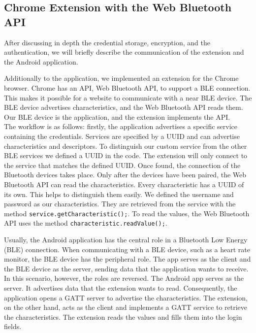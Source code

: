 
\subsection{Chrome Extension with the Web Bluetooth API}
After discussing in depth the credential storage, encryption, and the authentication, we will briefly describe the communication of the extension and the Android application.

Additionally to the application, we implemented an extension for the Chrome browser. Chrome has an API, Web Bluetooth API, to support a BLE connection. \cite{WebBTAPI} This makes it possible for a website to communicate with a near BLE device. The BLE device advertises characteristics, and the Web Bluetooth API reads them. Our BLE device is the application, and the extension implements the API. \\
The workflow is as follows: firstly, the application advertises a specific service containing the credentials. Services are specified by a UUID and can advertise characteristics and descriptors. To distinguish our custom service from the other BLE services we defined a UUID in the code. The extension will only connect to the service that matches the defined UUID. Once found, the connection of the Bluetooth devices takes place. Only after the devices have been paired, the Web Bluetooth API can read the characteristics. Every characteristic has a UUID of its own. This helps to distinguish them easily. We defined the username and password as our characteristics. They are retrieved from the service with the method \texttt{service.getCharacteristic();}. To read the values, the Web Bluetooth API uses the method \texttt{characteristic.readValue();}. \cite{WebBTAPI}

Usually, the Android application has the central role in a Bluetooth Low Energy (BLE) connection. When communicating with a BLE device, such as a heart rate monitor, the BLE device has the peripheral role. The app serves as the client and the BLE device as the server, sending data that the application wants to receive. \\
In this scenario, however, the roles are reversed. The Android app serves as the server. It advertises data that the extension wants to read. Consequently, the application opens a GATT server to advertise the characteristics. The extension, on the other hand, acts as the client and implements a GATT service to retrieve the characteristics. The extension reads the values and fills them into the login fields. \\
